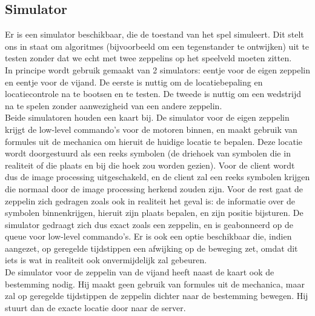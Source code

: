 \documentclass[eind]{penoverslag}
\begin{document}
\subsection{Simulator}
Er is een simulator beschikbaar, die de toestand van het spel simuleert. Dit stelt ons in staat om algoritmes (bijvoorbeeld om een tegenstander te ontwijken) uit te testen zonder dat we echt met twee zeppelins op het speelveld moeten zitten.\\
In principe wordt gebruik gemaakt van 2 simulators: eentje voor de eigen zeppelin en eentje voor de vijand. De eerste is nuttig om de locatiebepaling en locatiecontrole na te bootsen en te testen. De tweede is nuttig om een wedstrijd na te spelen zonder aanwezigheid van een andere zeppelin. \\
Beide simulatoren houden een kaart bij. De simulator voor de eigen zeppelin krijgt de low-level commando's voor de motoren binnen, en maakt gebruik van formules uit de mechanica om hieruit de huidige locatie te bepalen. Deze locatie wordt doorgestuurd als een reeks symbolen (de driehoek van symbolen die in realiteit of die plaats en bij die hoek zou worden gezien). Voor de client wordt dus de image processing uitgeschakeld, en de client zal een reeks symbolen krijgen die normaal door de image processing herkend zouden zijn. Voor de rest gaat de zeppelin zich gedragen zoals ook in realiteit het geval is: de informatie over de symbolen binnenkrijgen, hieruit zijn plaats bepalen, en zijn positie bijsturen. De simulator gedraagt zich dus exact zoals een zeppelin, en is geabonneerd op de queue voor low-level commando's. Er is ook een optie beschikbaar die, indien aangezet, op geregelde tijdstippen een afwijking op de beweging zet, omdat dit iets is wat in realiteit ook onvermijdelijk zal gebeuren.\\
De simulator voor de zeppelin van de vijand heeft naast de kaart ook de bestemming nodig. Hij maakt geen gebruik van formules uit de mechanica, maar zal op geregelde tijdstippen de zeppelin dichter naar de bestemming bewegen. Hij stuurt dan de exacte locatie door naar de server. \\


\end{document}
